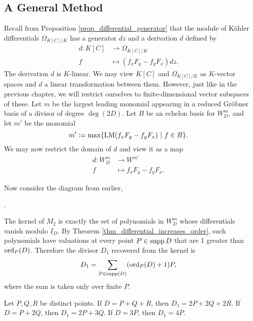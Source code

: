 
\subsection{A General Method}

Recall from Proposition \ref{prop_differential_generator}
that the module of K\"ahler differentials $\Omega_{K[C]/K}$ has a generator $dz$
and a derivation $d$ defined by
\begin{align*}
  d : K[C] &\to \Omega_{K[C]/K} \\
  f &\mapsto (f_xF_y - f_yF_x)dz.
\end{align*}
The derivation $d$ is $K$-linear.
We may view $K[C]$ and $\Omega_{K[C]/K}$ as $K$-vector spaces and $d$ a linear transformation between them.
However, just like in the previous chapter, we will restrict ourselves to finite-dimensional vector subspaces of these.
Let $m$ be the largest leading monomial appearing in a reduced Gr\"obner basis of a divisor of degree $\deg(2D)$.
Let $B$ be an echelon basis for $W_D^m$, and let $m'$ be the monomial
\[ m' := \max\{\operatorname{LM}(f_xF_y - f_yF_x) ~|~ f \in B \}. \]
We may now restrict the domain of $d$ and view it as a map
\begin{align*}
  d : W_D^m &\to W^{m'} \\
  f &\mapsto f_xF_y - f_yF_x.
\end{align*}

Now consider the diagram from earlier,
\begin{center}
  .
\end{center}
The kernel of $M_2$ is exactly the set of polynomials in $W_D^m$ whose differentials vanish modulo $I_D$.
By Theorem \ref{thm_differential_increases_order},
such polynomials have valuations at every point $P \in \operatorname{supp} D$ that are 1 greater than $\operatorname{ord}_P(D)$.
Therefore the divisor $D_1$ recovered from the kernel is
\[ D_1 = \sum_{P \in \operatorname{supp}(D)} (\operatorname{ord}_P(D) + 1)P, \]
where the sum is taken only over finite $P$.
\begin{example}
  Let $P,Q,R$ be distinct points.
  If $D = P + Q + R$, then $D_1 = 2P + 2Q + 2R$.
  If $D = P + 2Q$, then $D_1 = 2P + 3Q$.
  If $D = 3P$, then $D_1 = 4P$.
\end{example}

